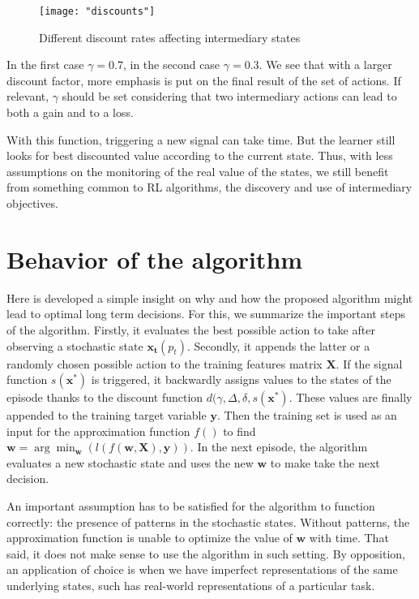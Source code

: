 \documentclass[scrartcl, 10.5 pt, conference]{ieeeconf}
\newcommand{\B}[1]{\mathbf{#1}}
\begin{document}
\begin{figure}
\begin{center}
\texttt{[image: "discounts"]}
\caption{Different discount rates affecting intermediary states}
\label{fig:discounts}
\end{center}
\end{figure}

In the first case $\gamma=0.7$, in the second case $\gamma=0.3$. We see that with a larger discount factor, more emphasis is put on the final result of the set of actions. If relevant, $\gamma$ should be set considering that two intermediary actions can lead to both a gain and to a loss.

With this function, triggering a new signal can take time. But the learner still looks for best discounted value according to the current state. Thus, with less assumptions on the monitoring of the real value of the states, we still benefit from something common to RL algorithms, the discovery and use of intermediary objectives.

\section{Behavior of the algorithm}

Here is developed a simple insight on why and how the proposed algorithm might lead to optimal long term decisions. For this, we summarize the important steps of the algorithm. Firstly, it evaluates the best possible action to take after observing a stochastic state $\B{x_t}(p_t)$. Secondly, it appends the latter or a randomly chosen possible action to the training features matrix $\B{X}$. If the signal function $s(\B{x^*})$ is triggered, it backwardly assigns values to the states of the episode thanks to the discount function $d(\gamma, \Delta, \delta, s(\B{x^*})$. These values are finally appended to the training target variable $\B{y}$. Then the training set is used as an input for the approximation function $f()$ to find $\B{w} = \arg\min_{\B{w}}(l(f(\B{w},\B{X}),\B{y}))$. In the next episode, the algorithm evaluates a new stochastic state and uses the new $\B{w}$ to make take the next decision.

An important assumption has to be satisfied for the algorithm to function correctly: the presence of patterns in the stochastic states. Without patterns, the approximation function is unable to optimize the value of $\B{w}$ with time. That said, it does not make sense to use the algorithm in such setting. By opposition, an application of choice is when we have imperfect representations of the same underlying states, such has real-world representations of a particular task.
\end{document}
